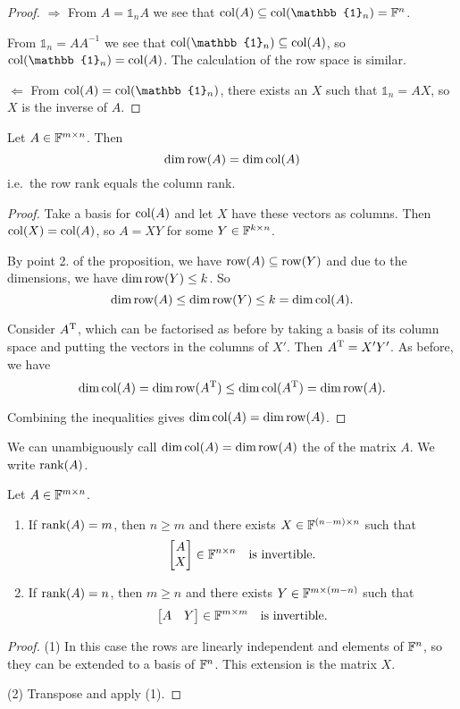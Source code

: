 \begin{proof}
$\boxed{\Rightarrow}$ From $A = \mathbb{1}_nA$ we see that $\Col(A)\subseteq\Col(\mathbb{1}_n) = \F^n$.

From $\mathbb{1}_n = AA^{-1}$ we see that $\Col(\mathbb{1}_n)\subseteq\Col(A)$, so $\Col(\mathbb{1}_n) = \Col(A)$. The calculation of the row space is similar.

$\boxed{\Leftarrow}$ From $\Col(A) = \Col(\mathbb{1}_n)$, there exists an $X$ such that $\mathbb{1}_n = AX$, so $X$ is the inverse of $A$.
\end{proof}
\begin{corollary}
Let $A\in\mathbb{F}^{m\times n}$. Then
\[ \dim\operatorname{row}(A) = \dim\operatorname{col}(A) \]
i.e.\ the row rank equals the column rank.
\end{corollary}
\begin{proof}
Take a basis for $\operatorname{col}(A)$ and let $X$ have these vectors as columns. Then $\operatorname{col}(X) = \operatorname{col}(A)$, so $A = XY$ for some $Y\in\mathbb{F}^{k\times n}$.

By point 2. of the proposition, we have $\operatorname{row}(A)\subseteq \operatorname{row}(Y)$ and due to the dimensions, we have $\dim\operatorname{row}(Y)\leq k$. So
\[ \dim\operatorname{row}(A) \leq \dim\operatorname{row}(Y) \leq k = \dim\operatorname{col}(A). \]

Consider $A^{\mathrm{T}}$, which can be factorised as before by taking a basis of its column space and putting the vectors in the columns of $X'$. Then $A^{\mathrm{T}} = X'Y'$. As before, we have
\[ \dim\operatorname{col}(A) = \dim\operatorname{row}(A^{\mathrm{T}}) \leq \dim\operatorname{col}(A^{\mathrm{T}}) = \dim\operatorname{row}(A). \]

Combining the inequalities gives $\dim\operatorname{col}(A) = \dim\operatorname{row}(A)$.
\end{proof}
\begin{definition}
We can unambiguously call $\dim\operatorname{col}(A)=\dim\operatorname{row}(A)$ the  of the matrix $A$. We write $\operatorname{rank}(A)$.
\end{definition}

\begin{lemma} \label{extendToInvertible}
Let $A\in\mathbb{F}^{m\times n}$.
\begin{enumerate}
\item If $\operatorname{rank}(A) = m$, then $n\geq m$ and there exists $X\in\mathbb{F}^{(n-m)\times n}$ such that
\[ \begin{bmatrix}
A \\ X
\end{bmatrix} \in \mathbb{F}^{n\times n} \quad \text{is invertible.} \]
\item If $\operatorname{rank}(A) = n$, then $m\geq n$ and there exists $Y\in\mathbb{F}^{m\times (m-n)}$ such that
\[ \begin{bmatrix}
A & Y
\end{bmatrix} \in \mathbb{F}^{m\times m} \quad \text{is invertible.} \]
\end{enumerate}
\end{lemma}
\begin{proof}
(1) In this case the rows are linearly independent and elements of $\mathbb{F}^n$, so they can be extended to a basis of $\mathbb{F}^n$. This extension is the matrix $X$.

(2) Transpose and apply (1).
\end{proof}

